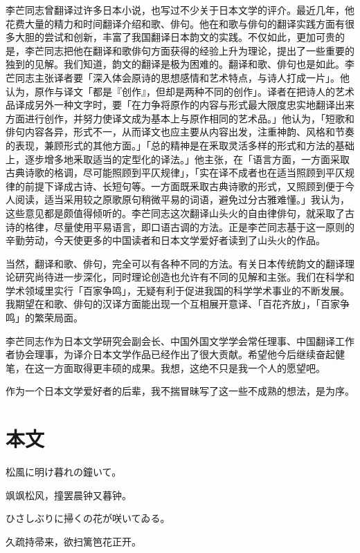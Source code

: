 {    李芒同志曾翻译过许多日本小说，也写过不少关于日本文学的评介。最近几年，他花费大量的精力和时间翻译介绍和歌、俳句。他在和歌与俳句的翻译实践方面有很多大胆的尝试和创新，丰富了我国翻译日本韵文的实践。不仅如此，更加可贵的是，李芒同志把他在翻译和歌俳句方面获得的经验上升为理论，提出了一些重要的独到的见解。我们知道，韵文的翻译是极为困难的。翻译和歌、俳句也是如此。李芒同志主张译者要「深入体会原诗的思想感情和艺术特点，与诗人打成一片」。他认为，原作与译文「都是『创作』，但却是两种不同的创作」。译者在把诗人的艺术品译成另外一种文字时，要「在力争将原作的内容与形式最大限度忠实地翻译出来方面进行创作，并努力使译文成为基本上与原作相同的艺术品。」他认为，「短歌和俳句内容各异，形式不一，从而译文也应主要从内容出发，注重神韵、风格和节奏的表现，兼顾形式的其他方面。」「总的精神是在釆取灵活多样的形式和方法的基础上，逐步增多地釆取适当的定型化的译法。」他主张，在「语言方面，一方面采取古典诗歌的格调，尽可能照顾到平仄规律」，「实在译不成者也在适当照顾到平仄规律的前提下译成古诗、长短句等。一方面既釆取古典诗歌的形式，又照顾到便于今人阅读，适当采用较之原歌原句稍微平易的词语，避免过分古雅难懂。」我认为，这些意见都是颇值得倾听的。李芒同志这次翻译山头火的自由律俳句，就采取了古诗的格律，尽量使用平易语言，即口语古调的方法。正是李芒同志基于这一原则的辛勤劳动，今天使更多的中国读者和日本文学爱好者读到了山头火的作品。

    当然，翻译和歌、俳句，完全可以有各种不同的方法。有关日本传统韵文的翻译理论研究尚待进一步深化，同时理论创造也允许有不同的见解和主张。我们在科学和学术领域里实行「百家争鸣」，无疑有利于促进我国的科学学术事业的不断发展。我期望在和歌、俳句的汉译方面能出现一个互相展开意译、「百花齐放」，「百家争鸣」的繁荣局面。

    李芒同志作为日本文学研究会副会长、中国外国文学学会常任理事、中国翻译工作者协会理事，为译介日本文学作品已经作出了很大贡献。希望他今后继续奋起健笔，在这一方面取得更丰硕的成果。我想，这绝不只是我一个人的愿望吧。

    作为一个日本文学爱好者的后辈，我不揣冒昧写了这一些不成熟的想法，是为序。
}

\chapter{\FK 本文}
\setcounter{haikucounter}{0}

\begin{haiku}
    {\FH 松風に明け暮れの鐘いて。}

    {\FK 飒飒松风，撞罢晨钟又暮钟。}
\end{haiku}

\begin{haiku}
    {\FH ひさしぶりに掃くの花が咲いてゐる。}

    {\FK 久疏持帚来，欲扫篱笆花正开。}
\end{haiku}

